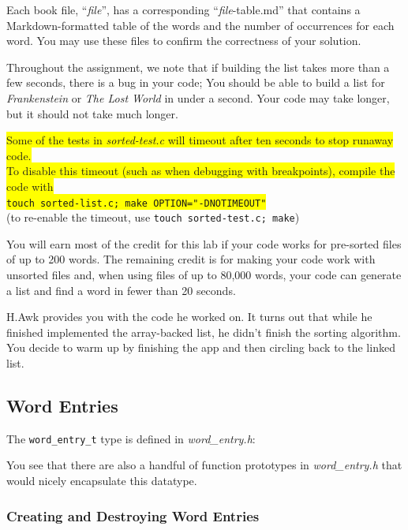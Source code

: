 Each book file, ``\textit{file}'', has a corresponding ``\textit{file}-table.md'' that contains a Markdown-formatted table of the words and the number of occurrences for each word.
You may use these files to confirm the correctness of your solution.

Throughout the assignment, we note that if building the list takes more than a few seconds, there is a bug in your code;
You should be able to build a list for \textit{Frankenstein} or \textit{The Lost World} in under a second.
Your code may take longer, but it should not take much longer.

\colorbox{yellow}{Some of the tests in \textit{sorted-test.c} will timeout after ten seconds to stop runaway code.} \\
\colorbox{yellow}{To disable this timeout (such as when debugging with breakpoints), compile the code with} \\
\colorbox{yellow}{\texttt{touch sorted-list.c; make OPTION="-DNOTIMEOUT"}} \\
(to re-enable the timeout, use \texttt{touch sorted-test.c; make})

You will earn most of the credit for this lab if your code works for pre-sorted files of up to 200 words.
The remaining credit is for making your code work with unsorted files and, when using files of up to 80,000 words, your code can generate a list and find a word in fewer than 20 seconds.

\vspace{1cm}

H.Awk provides you with the code he worked on.
It turns out that while he finished implemented the array-backed list, he didn't finish the sorting algorithm.
You decide to warm up by finishing the app and then circling back to the linked list.

\subsection{Word Entries}

The \lstinline{word_entry_t} type is defined in \textit{word\_entry.h}:



You see that there are also a handful of function prototypes in \textit{word\_entry.h} that would nicely encapsulate this datatype.

\subsubsection{Creating and Destroying Word Entries}

